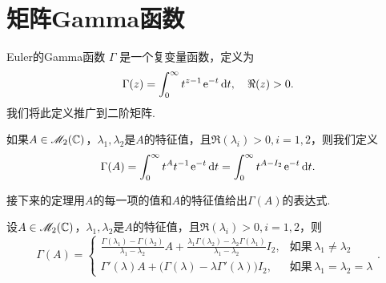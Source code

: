 \section{矩阵Gamma函数}
Euler的Gamma函数 $\Gamma$ \cite[p.235]{61} 是一个复变量函数，定义为
\[
  \Gamma(z) = \int_0^\infty t^{z-1} \operatorname{\!\!\;\mathrm e}^{-t}\mathop{}\!\mathrm d t,\quad \Re(z)>0.
\]
我们将此定义推广到二阶矩阵.

\begin{mybox}
  \begin{definition}

    如果$A\in\mathscr M_2(\mathbb C)$，$\lambda_1,\lambda_2$是$A$的特征值，且$\Re(\lambda_i)>0,i=1,2$，则我们定义
    \[
      \Gamma(A) = \int_0^\infty t^A t^{-1}\operatorname{\!\!\;\mathrm e}^{-t}\mathop{}\!\mathrm d t = \int_0^\infty t^{A-I_2}\operatorname{\!\!\;\mathrm e}^{-t}\mathop{}\!\mathrm d t.
    \]
  \end{definition}
\end{mybox}

接下来的定理用$A$的每一项的值和$A$的特征值给出$\Gamma(A)$的表达式.

\begin{mybox}
  \begin{theorem}
    设$A\in\mathscr M_2(\mathbb C)$，$\lambda_1,\lambda_2$是$A$的特征值，且$\Re(\lambda_i)>0,i=1,2$，则
    \[
      \Gamma(A) = \begin{cases}
        \frac{\Gamma(\lambda_1)-\Gamma(\lambda_2)}{
        \lambda_1-\lambda_2}A + \frac{
        \lambda_1\Gamma(\lambda_2)-\lambda_2
        \Gamma(\lambda_1)}{\lambda_1-\lambda_2}I_2, & \text{如果}\, \lambda_1\ne \lambda_2 \\
        \Gamma'(\lambda)A + \big( \Gamma(\lambda) - \lambda\Gamma'(\lambda) \big)I_2, & \text{如果}\, \lambda_1=\lambda_2=\lambda
      \end{cases}.
    \]
  \end{theorem}
\end{mybox}

